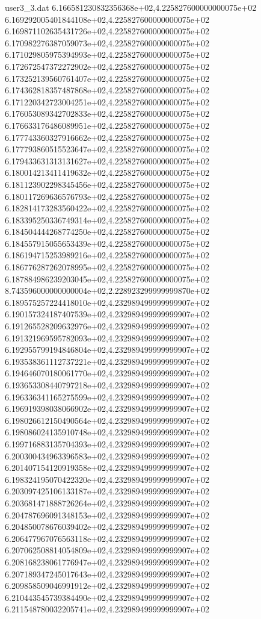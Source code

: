 \begin{filecontents}{user3_3.dat}
6.166581230832356368e+02,4.225827600000000075e+02
6.169292005401844108e+02,4.225827600000000075e+02
6.169871102635431726e+02,4.225827600000000075e+02
6.170982276387059073e+02,4.225827600000000075e+02
6.171029805975394993e+02,4.225827600000000075e+02
6.172672547372272902e+02,4.225827600000000075e+02
6.173252139560761407e+02,4.225827600000000075e+02
6.174362818357487868e+02,4.225827600000000075e+02
6.171220342723004251e+02,4.225827600000000075e+02
6.176053089342702833e+02,4.225827600000000075e+02
6.176633176486089951e+02,4.225827600000000075e+02
6.177743360327916662e+02,4.225827600000000075e+02
6.177793860515523647e+02,4.225827600000000075e+02
6.179433631313131627e+02,4.225827600000000075e+02
6.180014213411419632e+02,4.225827600000000075e+02
6.181123902298345456e+02,4.225827600000000075e+02
6.180117269636576793e+02,4.225827600000000075e+02
6.182814173283560422e+02,4.225827600000000075e+02
6.183395250336749314e+02,4.225827600000000075e+02
6.184504444268774250e+02,4.225827600000000075e+02
6.184557915055653439e+02,4.225827600000000075e+02
6.186194715253989216e+02,4.225827600000000075e+02
6.186776287262078995e+02,4.225827600000000075e+02
6.187884986239203045e+02,4.225827600000000075e+02
8.743596000000000004e+02,2.228923299999999870e+02
6.189575257224418010e+02,4.232989499999999907e+02
6.190157324187407539e+02,4.232989499999999907e+02
6.191265528209632976e+02,4.232989499999999907e+02
6.191321969595782093e+02,4.232989499999999907e+02
6.192955799194846804e+02,4.232989499999999907e+02
6.193538361112737221e+02,4.232989499999999907e+02
6.194646070180061770e+02,4.232989499999999907e+02
6.193653308440797218e+02,4.232989499999999907e+02
6.196336341165275599e+02,4.232989499999999907e+02
6.196919398038066902e+02,4.232989499999999907e+02
6.198026612150490564e+02,4.232989499999999907e+02
6.198086024135910748e+02,4.232989499999999907e+02
6.199716883135704393e+02,4.232989499999999907e+02
6.200300434963396583e+02,4.232989499999999907e+02
6.201407154120919358e+02,4.232989499999999907e+02
6.198324195070422320e+02,4.232989499999999907e+02
6.203097425106133187e+02,4.232989499999999907e+02
6.203681471888726264e+02,4.232989499999999907e+02
6.204787696091348153e+02,4.232989499999999907e+02
6.204850078676039402e+02,4.232989499999999907e+02
6.206477967076563118e+02,4.232989499999999907e+02
6.207062508814054809e+02,4.232989499999999907e+02
6.208168238061776947e+02,4.232989499999999907e+02
6.207189347245017643e+02,4.232989499999999907e+02
6.209858509046991912e+02,4.232989499999999907e+02
6.210443545739384490e+02,4.232989499999999907e+02
6.211548780032205741e+02,4.232989499999999907e+02

\end{filecontents}
